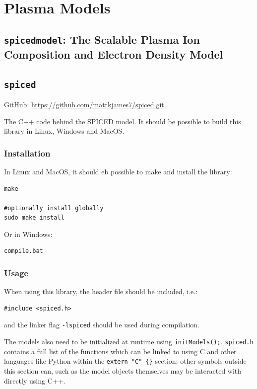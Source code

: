 \chapter{Plasma Models}

	\section{\texttt{spicedmodel}: The Scalable Plasma Ion Composition and Electron Density Model}



	\section{\texttt{spiced}}

		GitHub: \href{https://github.com/mattkjames7/spiced.git}{https://github.com/mattkjames7/spiced.git}

		The C++ code behind the SPICED model. It should be possible to build this library in Linux, Windows and MacOS.

		\subsection{Installation}

			In Linux and MacOS, it should eb possible to make and install the library:
			\begin{verbatim}
make

#optionally install globally
sudo make install
			\end{verbatim}

			Or in Windows:
			\begin{verbatim}
compile.bat
			\end{verbatim}

		\subsection{Usage}

			When using this library, the header file should be included, i.e.:
			\begin{verbatim}
#include <spiced.h>
			\end{verbatim}
			and the linker flag \texttt{-lspiced} should be used during compilation.

			The models also need to be initialized at runtime using \texttt{initModels();}. \texttt{spiced.h} contains a full list of the functions which can be linked to using C and other languages like Python within the \texttt{extern "C" \{\}} section; other symbols outside this section can, such as the model objects themselves may be interacted with directly using C++.

